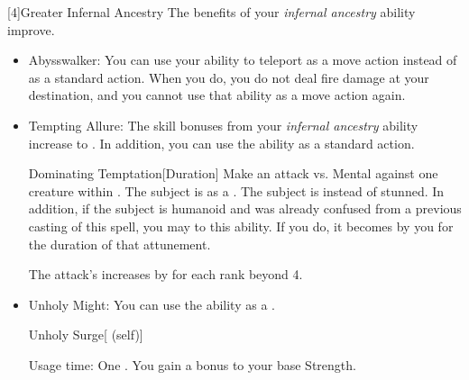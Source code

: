             [4]{Greater Infernal Ancestry} The benefits of your \textit{infernal ancestry} ability improve.
            \begin{itemize}
                \item Abysswalker: You can use your  ability to teleport as a move action instead of as a standard action.
                    When you do, you do not deal fire damage at your destination, and you  cannot use that ability as a move action again.
                \item Tempting Allure: The skill bonuses from your \textit{infernal ancestry} ability increase to .
                    In addition, you can use the  ability as a standard action.
                    \begin{durationability}{Dominating Temptation}[Duration]
                        \rankline
                        \noindent
                        Make an attack vs. Mental against one creature within \shortrange.%
                        \vspace{0.25em}
                        \hit The subject is \stunned as a .
                        \crit The subject is \confused instead of stunned.
                        In addition, if the subject is humanoid and was already confused from a previous casting of this spell, you may  to this ability.
                        If you do, it becomes \dominated by you for the duration of that attunement.

                        \rankline
                        \noindent The attack's  increases by  for each rank beyond 4.
                        \vspace{0.1em}
                    \end{durationability}
                \item Unholy Might: You can use the  ability as a .
                    \begin{attuneability}{Unholy Surge}[ (self)]
                        \par \noindent Usage time: One .
                        \rankline
                        You gain a  bonus to your base Strength.
                    \end{attuneability}
            \end{itemize}


